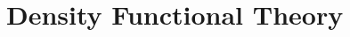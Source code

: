 \documentclass[../main.tex]{subfiles}
\begin{document}
\section{\textbf{Density Functional Theory}}
\end{document}
